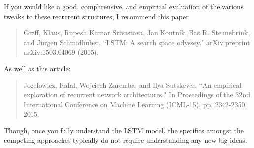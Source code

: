 \documentclass[xetex,mathserif,serif,aspectratio=169]{beamer}
\begin{document}
\begin{frame}[fragile] \frametitle{} \oldB \small

If you would like a good, comphrensive, and empirical
evaluation of the various tweaks to these recurrent
structures, I recommend this paper
\begin{quote}
Greff, Klaus, Rupesh Kumar Srivastava, Jan Koutník, Bas R. Steunebrink,
and Jürgen Schmidhuber. ``LSTM: A search space odyssey."
arXiv preprint arXiv:1503.04069 (2015).
\end{quote}
As well as this article:
\begin{quote}
Jozefowicz, Rafal, Wojciech Zaremba, and Ilya Sutskever.
``An empirical exploration of recurrent network architectures."
In Proceedings of the 32nd International Conference on Machine
Learning (ICML-15), pp. 2342-2350. 2015.
\end{quote}
Though, once you fully understand the LSTM model, the
specifics amongst the competing approaches typically do not
require understanding any new big ideas.

\end{frame}

\begin{frame}[fragile] \frametitle{} \oldB \small


\end{frame}

\begin{frame}[fragile] \frametitle{} \oldB \small


\end{frame}

\begin{frame}[fragile] \frametitle{} \oldB \small


\end{frame}
\end{document}
